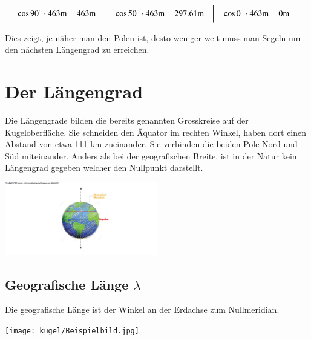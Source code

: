 \begin{refsection}
\[
\begin{aligned}
&\cos 90^\circ \cdot 463\text{m} = 463\text{m}
&
&\text{\bigg \vert}
&
&\cos 50^\circ \cdot 463\text{m} = 297.61\text{m}
&
&\text{\bigg \vert}
&
&\cos 0^\circ \cdot 463\text{m} = 0\text{m}
\end{aligned}
\]

Dies zeigt, je näher man den Polen ist, desto weniger weit muss man Segeln um den nächsten Längengrad zu erreichen.



\section{Der Längengrad}
Die Längengrade bilden die bereits genannten Grosskreise auf der Kugeloberfläche.
Sie schneiden den Äquator im rechten Winkel, haben dort einen Abstand von etwa 111 km zueinander. Sie verbinden die beiden Pole Nord und Süd miteinander. Anders als bei der geografischen Breite, ist in der Natur kein Längengrad gegeben welcher den Nullpunkt darstellt.

\begin{center}
        \includegraphics[width=0.5\textwidth]{kugel/1Langengrad.jpg}
\end{center}


\subsection{Geografische Länge $\lambda$}
\begin{definition}
Die geografische Länge ist der Winkel an der Erdachse zum Nullmeridian.
\end{definition}

\begin{center}
        \texttt{[image: kugel/Beispielbild.jpg]}
\end{center}


\end{refsection}
